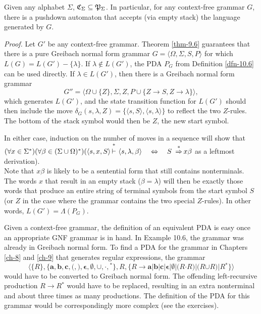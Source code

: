 \begin{thm}\label{thm-10.2}
Given any alphabet $\Sigma$, $\mathfrak{C}_\Sigma\subseteq\mathfrak{P}_\Sigma$. In particular, for any
context-free grammar $G$, there is a pushdown automaton that accepts (via empty
stack) the language generated by $G$.

\emph{Proof.} Let $G'$ be any context-free grammar. Theorem \ref{thm-9.6} guarantees that
there is a pure Greibach normal form grammar $G=\langle\Omega,\Sigma,S,P\rangle$
for which $L(G)=L(G')-\{\lambda\}$. If $\lambda\not \in L(G')$, the PDA $P_G$ from
Definition \ref{dfn-10.6} can be used directly. If $\lambda\in L(G')$, then there is a
Greibach normal form grammar
\[ G''=\langle\Omega\cup\{Z\},\Sigma,Z,P\cup\{Z\rightarrow S,Z\rightarrow\lambda
	\}\rangle, \]
which generates $L(G')$, and the state transition function for $L(G')$ should
then include the move $\delta_G(s,\lambda,Z)=\{\langle s,S\rangle,\langle s,
\lambda\rangle\}$ to reflect the two $Z$-rules. The bottom of the stack symbol
would then be $Z$, the new start symbol.

In either case, induction on the number of moves in a sequence will show that\\
$(\forall x\in\Sigma^*)(\forall\beta\in(\Sigma\cup\Omega)^*)(\langle s,x,S
\rangle\Dvdash\langle s,\lambda,\beta\rangle  \ \ \  \Leftrightarrow\ \ \ S\ \DRightarrow x\beta$ as a
leftmost derivation).\\Note that $x\beta$ is likely to be a sentential form that
still contains nonterminals. The words $x$ that result in an empty stack ($\beta
=\lambda$) will then be exactly those words that produce an entire string of
terminal symbols from the start symbol $S$ (or $Z$ in the case where the grammar
contains the two special $Z$-rules). In other words, $L(G')=\Lambda(P_G)$.
\end{thm}

Given a context-free grammar, the definition of an equivalent PDA is easy once
an appropriate GNF grammar is in hand. In Example 10.6, the grammar was already
in Greibach normal form. To find a PDA for the grammar in Chapters \ref{ch-8} and \ref{ch-9} that
generates regular expressions, the grammar
\[ \langle\{R\},\{\pmb{a},\pmb{b},\pmb{c},\pmb{(},\pmb{)},\pmb{\epsilon},
	\pmb{\emptyset},\pmb{\cup},\pmb{\cdot},\pmb{^*}\},R,\{R\rightarrow
	\pmb{a}|\pmb{b}|\pmb{c}|\pmb{\epsilon}|\pmb{\emptyset}|\pmb{(}R
	\pmb{\cdot}R\pmb{)}|\pmb{(}R\pmb{\cup}R\pmb{)}|R\pmb{^*}\}\rangle \]
would have to be converted to Greibach normal form. The offending left-recursive
production $R\rightarrow R\pmb{^*}$ would have to be replaced, resulting in an
extra nonterminal and about three times as many productions. The definition of
the PDA for this grammar would be correspondingly more complex (see the
exercises).

